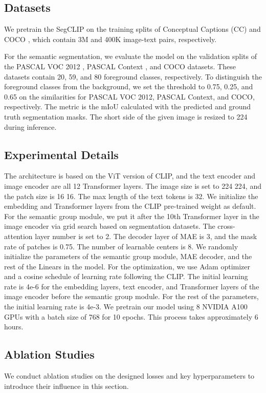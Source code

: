 \documentclass{article}
\theoremstyle{plain}
\theoremstyle{definition}
\theoremstyle{remark}
\begin{document}
\subsection{Datasets}
We pretrain the SegCLIP on the training splits of Conceptual Captions (CC) \cite{Sharma2018CC} and COCO \cite{Lin2014COCO}, which contain 3M and 400K image-text pairs, respectively. 

For the semantic segmentation, we evaluate the model on the validation splits of the PASCAL VOC 2012 \cite{Everingham2010VOC}, PASCAL Context \cite{Mottaghi2014Context}, and COCO datasets. These datasets contain  20, 59, and 80 foreground classes, respectively. To distinguish the foreground classes from the background, we set the threshold to 0.75, 0.25, and 0.65 on the similarities for PASCAL VOC 2012, PASCAL Context, and COCO, respectively. The metric is the mIoU calculated with the predicted and ground truth segmentation masks. The short side of the given image is resized to 224 during inference.

\subsection{Experimental Details}
The architecture is based on the ViT version of CLIP, and the text encoder and image encoder are all 12 Transformer layers. The image size is set to 224  224, and the patch size is 16  16. The max length of the text tokens is 32. We initialize the embedding and Transformer layers from the CLIP pre-trained weight as default. For the semantic group module, we put it after the 10th Transformer layer in the image encoder via grid search based on segmentation datasets. The cross-attention layer number is set to 2. The decoder layer of MAE is 3, and the mask rate of patches is 0.75. The number of learnable centers is 8. We randomly initialize the parameters of the semantic group module, MAE decoder, and the rest of the Linears in the model. For the optimization, we use Adam optimizer and a cosine schedule of learning rate following the CLIP. The initial learning rate is 4e-6 for the embedding layers, text encoder, and Transformer layers of the image encoder before the semantic group module. For the rest of the parameters, the initial learning rate is 4e-3. We pretrain our model using 8 NVIDIA A100 GPUs with a batch size of 768 for 10 epochs. This process takes approximately 6 hours.

\subsection{Ablation Studies}
We conduct ablation studies on the designed losses and key hyperparameters to introduce their influence in this section.
\end{document}
